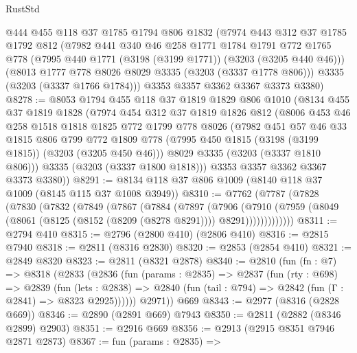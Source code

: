 \begin{lexlean}{RustStd}
\begin{coremodule}
    @444
    @455
    @118
    @37
    @1785
    @1794
    @806
    @1832
    (@7974
      @443
      @312
      @37
      @1785
      @1792
      @812
      (@7982
        @441
        @340
        @46
        @258
        @1771
        @1784
        @1791
        @772
        @1765
        @778
        (@7995 @440 @1771 (@3198 (@3199 @1771)) (@3203 (@3205 @440 @46)))
        (@8013 @1777 @778 @8026 @8029 @3335 (@3203 (@3337 @1778 @806)))
        @3335
        (@3203 (@3337 @1766 @1784)))
      @3353
      @3357
      @3362
      @3367
      @3373
      @3380)
@8278 := @8053
    @1794
    @455
    @118
    @37
    @1819
    @1829
    @806
    @1010
    (@8134
      @455
      @37
      @1819
      @1828
      (@7974
        @454
        @312
        @37
        @1819
        @1826
        @812
        (@8006
          @453
          @46
          @258
          @1518
          @1818
          @1825
          @772
          @1799
          @778
          @8026
          (@7982
            @451
            @57
            @46
            @33
            @1815
            @806
            @799
            @772
            @1809
            @778
            (@7995 @450 @1815 (@3198 (@3199 @1815)) (@3203 (@3205 @450 @46)))
            @8029
            @3335
            (@3203 (@3337 @1810 @806)))
          @3335
          (@3203 (@3337 @1800 @1818)))
        @3353
        @3357
        @3362
        @3367
        @3373
        @3380))
@8291 := @8134 @118 @37 @806 @1009 (@8140 @118 @37 @1009 (@8145 @115 @37 @1008 @3949))
@8310 := @7762
    (@7787
      (@7828
        (@7830
          (@7832
            (@7849
              (@7867
                (@7884
                  (@7897
                    (@7906
                      (@7910
                        (@7959
                          (@8049 (@8061 (@8125 (@8152 (@8209 (@8278 @8291)))) @8291)))))))))))))
@8311 := @2794 @410
@8315 := @2796 (@2800 @410) (@2806 @410)
@8316 := @2815 @7940
@8318 := @2811 (@8316 @2830)
@8320 := @2853 (@2854 @410)
@8321 := @2849 @8320
@8323 := @2811 (@8321 @2878)
@8340 := @2810
    (fun (fn : @7) =>
    @8318
      (@2833
        (@2836
          (fun (params : @2835) =>
          @2837
            (fun (rty : @698) =>
            @2839
              (fun (lets : @2838) =>
              @2840 (fun (tail : @794) => @2842 (fun (Γ : @2841) => @8323 @2925))))))
        @2971))
    @669
@8343 := @2977 (@8316 (@2828 @669))
@8346 := @2890 (@2891 @669) @7943
@8350 := @2811 (@2882 (@8346 @2899) @2903)
@8351 := @2916 @669
@8356 := @2913 (@2915 @8351 @7946 @2871 @2873)
@8367 := fun (params : @2835) =>

\end{coremodule}
\end{lexlean}
